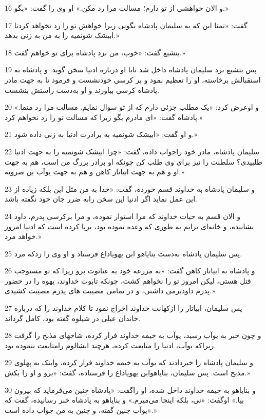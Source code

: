 \par 16 و الان خواهشی از تو دارم؛ مسالت مرا رد مکن.» او وی را گفت: «بگو.»
\par 17 گفت: «تمنا این که به سلیمان پادشاه بگویی زیرا خواهش تو را رد نخواهد کردتا ابیشک شونمیه را به من به زنی بدهد.»
\par 18 بتشبع گفت: «خوب، من نزد پادشاه برای تو خواهم گفت.»
\par 19 پس بتشبع نزد سلیمان پادشاه داخل شد تابا او درباره ادنیا سخن گوید. و پادشاه به استقبالش برخاسته، او را تعظیم نمود و بر کرسی خودنشست و فرمود تا به جهت مادر پادشاه کرسی بیاورند و او به‌دست راستش بنشست.
\par 20 و اوعرض کرد: «یک مطلب جزئی دارم که از تو سوال نمایم. مسالت مرا رد منما.» پادشاه گفت: «ای مادرم بگو زیرا که مسالت تو را رد نخواهم کرد.»
\par 21 و او گفت: «ابیشک شونمیه به برادرت ادنیا به زنی داده شود.»
\par 22 سلیمان پادشاه، مادر خود راجواب داده، گفت: «چرا ابیشک شونمیه را به جهت ادنیا طلبیدی؟ سلطنت را نیز برای وی طلب کن چونکه او برادر بزرگ من است، هم به جهت او و هم به جهت ابیاتار کاهن و هم به جهت یوآب بن صرویه.»
\par 23 و سلیمان پادشاه به خداوند قسم خورده، گفت: «خدا به من مثل این بلکه زیاده از این عمل نماید اگر ادنیا این سخن رابه ضرر جان خود نگفته باشد.
\par 24 و الان قسم به حیات خداوند که مرا استوار نموده، و مرا برکرسی پدرم، داود نشانیده، و خانه‌ای برایم به طوری که وعده نموده بود، برپا کرده است که ادنیا امروز خواهد مرد.» 
\par 25 پس سلیمان پادشاه به‌دست بنایاهو ابن یهویاداع فرستاد و او وی را زدکه مرد.
\par 26 و پادشاه به ابیاتار کاهن گفت: «به مزرعه خود به عناتوت برو زیرا که تو مستوجب قتل هستی، لیکن امروز تو را نخواهم کشت، چونکه تابوت خداوند، یهوه را در حضور پدرم داودبرمی داشتی، و در تمامی مصیبت های پدرم مصیبت کشیدی.»
\par 27 پس سلیمان، ابیاتار را ازکهانت خداوند اخراج نمود تا کلام خداوند را که درباره خاندان عیلی در شیلوه گفته بود، کامل گرداند.
\par 28 و چون خبر به یوآب رسید، یوآب به خیمه خداوند فرار کرده، شاخهای مذبح را گرفت زیراکه یوآب، ادنیا را متابعت کرده، هرچند ابشالوم رامتابعت ننموده بود.
\par 29 و سلیمان پادشاه را خبردادند که یوآب به خیمه خداوند فرار کرده، واینک به پهلوی مذبح است. پس سلیمان، بنایاهوابن یهویاداع را فرستاده، گفت: «برو و او را بکش.»
\par 30 و بنایاهو به خیمه خداوند داخل شده، او راگفت: «پادشاه چنین می‌فرماید که بیرون بیا.» اوگفت: «نی، بلکه اینجا می‌میرم.» و بنایاهو به پادشاه خبر رسانیده، گفت که «یوآب چنین گفته، و چنین به من جواب داده است.»
